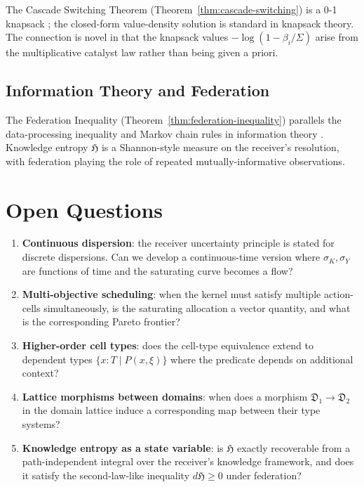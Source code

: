 \documentclass[twocolumn,11pt,a4paper]{article}
\newcommand{\Domain}{\mathfrak{D}}
\newcommand{\Sigmax}{\Sigma}
\newcommand{\disp}{\sigma}
\newcommand{\Hknow}{\mathfrak{H}}
\begin{document}
The Cascade Switching Theorem (Theorem~\ref{thm:cascade-switching}) is a 0-1 knapsack \citep{martello1990knapsack,kellerer2004knapsack}; the closed-form value-density solution is standard in knapsack theory. The connection is novel in that the knapsack values $-\log(1 - \beta_i/\Sigmax)$ arise from the multiplicative catalyst law rather than being given a priori.

\subsection{Information Theory and Federation}

The Federation Inequality (Theorem~\ref{thm:federation-inequality}) parallels the data-processing inequality and Markov chain rules in information theory \citep{cover2006elements,kullback1951information}. Knowledge entropy $\Hknow$ is a Shannon-style measure on the receiver's resolution, with federation playing the role of repeated mutually-informative observations.

\section{Open Questions}

\begin{enumerate}[nosep,leftmargin=*]
\item \textbf{Continuous dispersion}: the receiver uncertainty principle is stated for discrete dispersions. Can we develop a continuous-time version where $\disp_K, \disp_Y$ are functions of time and the saturating curve becomes a flow?
\item \textbf{Multi-objective scheduling}: when the kernel must satisfy multiple action-cells simultaneously, is the saturating allocation a vector quantity, and what is the corresponding Pareto frontier?
\item \textbf{Higher-order cell types}: does the cell-type equivalence extend to dependent types $\{x : T \mid P(x, \xi)\}$ where the predicate depends on additional context?
\item \textbf{Lattice morphisms between domains}: when does a morphism $\Domain_1 \to \Domain_2$ in the domain lattice induce a corresponding map between their type systems?
\item \textbf{Knowledge entropy as a state variable}: is $\Hknow$ exactly recoverable from a path-independent integral over the receiver's knowledge framework, and does it satisfy the second-law-like inequality $d\Hknow \geq 0$ under federation?
\end{enumerate}
\end{document}
